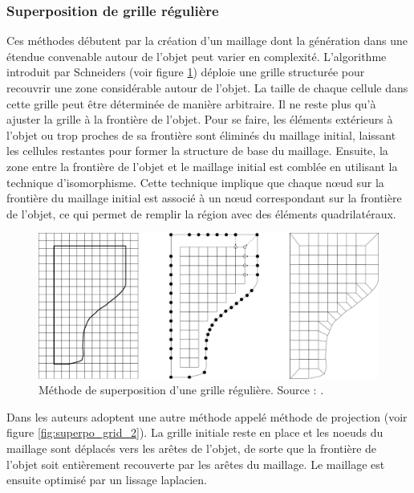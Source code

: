 \subsubsection{Superposition de grille régulière}

Ces méthodes débutent par la création d'un maillage dont la génération dans une étendue convenable autour de l'objet peut varier en complexité. L'algorithme introduit par Schneiders \cite{schneiders1996grid} (voir figure \ref{fig:superpo_grid_1}) déploie une grille structurée pour recouvrir une zone considérable autour de l'objet. La taille de chaque cellule dans cette grille peut être déterminée de manière arbitraire. Il ne reste plus qu'à ajuster la grille à la frontière de l'objet. Pour se faire, les éléments extérieurs à l'objet ou trop proches de sa frontière sont éliminés du maillage initial, laissant les cellules restantes pour former la structure de base du maillage. Ensuite, la zone entre la frontière de l'objet et le maillage initial est comblée en utilisant la technique d'isomorphisme. Cette technique implique que chaque nœud sur la frontière du maillage initial est associé à un nœud correspondant sur la frontière de l'objet, ce qui permet de remplir la région avec des éléments quadrilatéraux.

 \begin{figure}[!h]
    \centering
    \includegraphics[scale=0.4]{images/superpo_grid_1.png}
    \caption{Méthode de superposition d'une grille régulière. Source : \cite{schneiders1996grid}.}
    \label{fig:superpo_grid_1}
\end{figure}

Dans \cite{taghavi1994automatic, ives1995geometric} les auteurs adoptent une autre méthode appelé méthode de projection  (voir figure \ref{fig:superpo_grid_2}). La grille initiale reste en place et les noeuds du maillage sont déplacés vers les arêtes de l'objet, de sorte que la frontière de l'objet soit entièrement recouverte par les arêtes du maillage. Le maillage est ensuite optimisé par un lissage laplacien.

